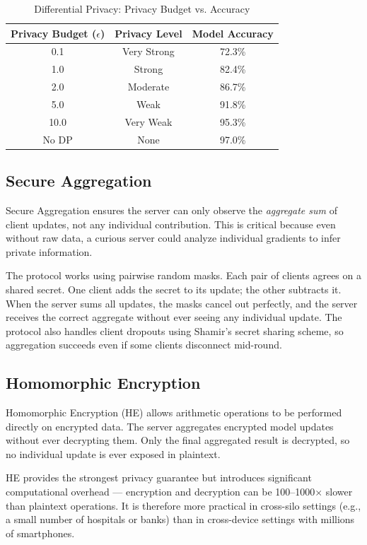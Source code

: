 \documentclass[conference]{IEEEtran}
\begin{document}
\begin{table}[H]
\centering
\caption{Differential Privacy: Privacy Budget vs. Accuracy}
\label{tab:dp_tradeoff}
\renewcommand{\arraystretch}{1.3}
\begin{tabular}{|c|c|c|}
\hline
\textbf{Privacy Budget ($\epsilon$)} & \textbf{Privacy Level} & \textbf{Model Accuracy} \\
\hline
0.1  & Very Strong & 72.3\% \\
1.0  & Strong      & 82.4\% \\
2.0  & Moderate    & 86.7\% \\
5.0  & Weak        & 91.8\% \\
10.0 & Very Weak   & 95.3\% \\
No DP & None       & 97.0\% \\
\hline
\end{tabular}
\end{table}

\subsection{Secure Aggregation}

Secure Aggregation \cite{bonawitz2017} ensures the server can only observe the \emph{aggregate sum} of client updates, not any individual contribution. This is critical because even without raw data, a curious server could analyze individual gradients to infer private information.

The protocol works using pairwise random masks. Each pair of clients agrees on a shared secret. One client adds the secret to its update; the other subtracts it. When the server sums all updates, the masks cancel out perfectly, and the server receives the correct aggregate without ever seeing any individual update. The protocol also handles client dropouts using Shamir's secret sharing scheme, so aggregation succeeds even if some clients disconnect mid-round.

\subsection{Homomorphic Encryption}

Homomorphic Encryption (HE) allows arithmetic operations to be performed directly on encrypted data. The server aggregates encrypted model updates without ever decrypting them. Only the final aggregated result is decrypted, so no individual update is ever exposed in plaintext.

HE provides the strongest privacy guarantee but introduces significant computational overhead — encryption and decryption can be 100--1000$\times$ slower than plaintext operations. It is therefore more practical in cross-silo settings (e.g., a small number of hospitals or banks) than in cross-device settings with millions of smartphones.
\end{document}
